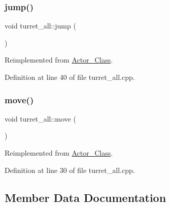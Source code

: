 \hypertarget{classturret__all_ac746cd08cbf83804b585d0df70aa9472}{}\label{classturret__all_ac746cd08cbf83804b585d0df70aa9472} 
\subsubsection{\texorpdfstring{jump()}{jump()}}
{\footnotesize\ttfamily void turret\+\_\+all\+::jump (\begin{DoxyParamCaption}{ }\end{DoxyParamCaption})\hspace{0.3cm}{\ttfamily [virtual]}}



Reimplemented from \hyperlink{class_actor___class_ab33216a3ce0c856bdc16231c71ae35c2}{Actor\+\_\+\+Class}.



Definition at line 40 of file turret\+\_\+all.\+cpp.

\hypertarget{classturret__all_a03416eb03334f4ee225c31cd18d25ba1}{}\label{classturret__all_a03416eb03334f4ee225c31cd18d25ba1} 
\subsubsection{\texorpdfstring{move()}{move()}}
{\footnotesize\ttfamily void turret\+\_\+all\+::move (\begin{DoxyParamCaption}{ }\end{DoxyParamCaption})\hspace{0.3cm}{\ttfamily [virtual]}}



Reimplemented from \hyperlink{class_actor___class_af1764a94c5410ba8476f56553cd2c327}{Actor\+\_\+\+Class}.



Definition at line 30 of file turret\+\_\+all.\+cpp.



\subsection{Member Data Documentation}
\hypertarget{classturret__all_a01784564dae9cc3e0ab320f1fa02f387}{}\label{classturret__all_a01784564dae9cc3e0ab320f1fa02f387} 
